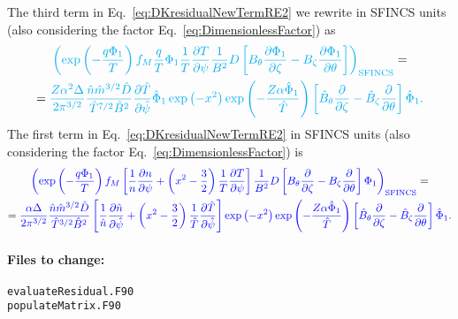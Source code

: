 \documentclass[12pt]{article}
\newcommand{\p}{\partial}
\begin{document}
The third term in Eq.~\ref{eq:DKresidualNewTermRE2} we rewrite in SFINCS units (also considering the factor Eq.~\ref{eq:DimensionlessFactor}) as
\begin{multline}
\textcolor{cyan}{
\left(\exp \left(- \frac{q \Phi_1}{T}  \right) f_{M} \frac{q}{T} \Phi_1 \frac{1}{T} \frac{\p T}{\p \psi} \frac{1}{B^2} D \left[B_\theta \frac{\p \Phi_1}{\p \zeta} - B_\zeta \frac{\p \Phi_1}{\p \theta}\right]\right)_{\mathrm{SFINCS}}} = \\ = \textcolor{cyan}{
\frac{Z \alpha^2 \Delta}{2 \pi^{3/2}} \frac{\hat{n} \hat{m}^{3/2} \hat{D}}{\hat{T}^{7/2} \hat{B}^2 } \frac{\p \hat{T}}{\p \hat{\psi}} \hat{\Phi}_1
\exp\left(-x^2\right) \exp \left(- \frac{Z \alpha \hat{\Phi}_1}{\hat{T}}\right) \left[\hat{B}_{\theta} \frac{\p}{\p \zeta} - \hat{B}_{\zeta} \frac{\p}{\p \theta}\right] \hat{\Phi}_1.
}
\label{eq:REterm3}
\end{multline}
The first term in Eq.~\ref{eq:DKresidualNewTermRE2} in SFINCS units (also considering the factor Eq.~\ref{eq:DimensionlessFactor}) is 
\begin{multline}
\textcolor{blue}{ \left(
\exp \left(- \frac{q \Phi_1}{T}  \right) f_{M} \left[\frac{1}{n} \frac{\p n}{\p \psi}  + \left(x^2 - \frac{3}{2} \right) \frac{1}{T} \frac{\p T}{\p \psi}\right] \frac{1}{B^2} D \left[B_\theta \frac{\p }{\p \zeta} - B_\zeta \frac{\p }{\p \theta}\right] \Phi_1\right)_{\mathrm{SFINCS}} } = \\ = 
\textcolor{blue}{
\frac{\alpha \Delta}{2 \pi^{3/2}} \frac{\hat{n} \hat{m}^{3/2} \hat{D}}{\hat{T}^{3/2} \hat{B}^2 }  \left[\frac{1}{\hat{n}} \frac{\p \hat{n}}{\p \hat{\psi}}  + \left(x^2 - \frac{3}{2} \right) \frac{1}{\hat{T}} \frac{\p \hat{T}}{\p \hat{\psi}}\right]
\exp\left(-x^2\right) \exp \left(- \frac{Z \alpha \hat{\Phi}_1}{\hat{T}}\right) \left[\hat{B}_{\theta} \frac{\p}{\p \zeta} - \hat{B}_{\zeta} \frac{\p}{\p \theta}\right] \hat{\Phi}_1.
}
\label{eq:REterm1}
\end{multline}

\paragraph*{\textbf{Files to change:}}
\begin{verbatim}
evaluateResidual.F90
populateMatrix.F90
\end{verbatim}
\end{document}
